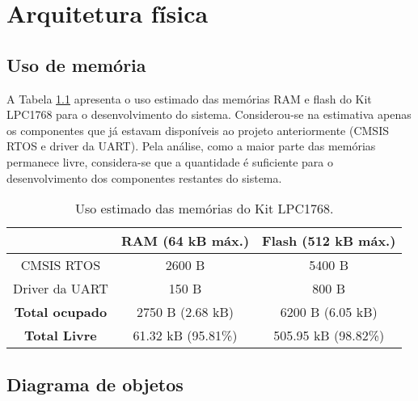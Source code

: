 \chapter{Arquitetura física}

\section{Uso de memória}

A Tabela \ref{tab:uso_memoria} apresenta o uso estimado das memórias RAM e flash do Kit LPC1768 para o desenvolvimento do sistema. Considerou-se na estimativa apenas os componentes que já estavam disponíveis ao projeto anteriormente (CMSIS RTOS e driver da UART). Pela análise, como a maior parte das memórias permanece livre, considera-se que a quantidade é suficiente para o desenvolvimento dos componentes restantes do sistema.

\begin{table}[h!]
	\caption{Uso estimado das memórias do Kit LPC1768.}
	\centering
	\begin{tabular}{|c|c|c|}
		\hline
		\textbf{} &\textbf{RAM (64 kB máx.)} & \textbf{Flash (512 kB máx.)} \\ \hline \hline
		CMSIS RTOS & 2600 B & 5400 B\\
		Driver da UART & 150 B & 800 B\\
		\hline
		\bf{Total ocupado} & 2750 B (2.68 kB) & 6200 B (6.05 kB)\\
		\bf{Total Livre} & 61.32 kB (95.81\%) & 505.95 kB (98.82\%) \\
		\hline
	\end{tabular}
	\label{tab:uso_memoria}
\end{table}


\section{Diagrama de objetos}
